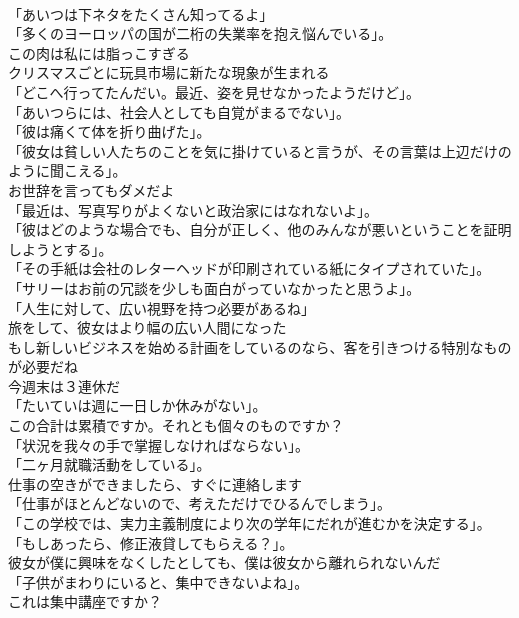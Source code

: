 \documentclass[8pt]{extreport}
\begin{document}
\begin{CJK}{UTF8}{min}
\\	「あいつは下ネタをたくさん知ってるよ」	
\\	「多くのヨーロッパの国が二桁の失業率を抱え悩んでいる」。	
\\	この肉は私には脂っこすぎる	
\\	クリスマスごとに玩具市場に新たな現象が生まれる	
\\	「どこへ行ってたんだい。最近、姿を見せなかったようだけど」。	
\\	「あいつらには、社会人としても自覚がまるでない」。	
\\	「彼は痛くて体を折り曲げた」。	
\\	「彼女は貧しい人たちのことを気に掛けていると言うが、その言葉は上辺だけのように聞こえる」。	
\\	お世辞を言ってもダメだよ	
\\	「最近は、写真写りがよくないと政治家にはなれないよ」。	
\\	「彼はどのような場合でも、自分が正しく、他のみんなが悪いということを証明しようとする」。	
\\	「その手紙は会社のレターヘッドが印刷されている紙にタイプされていた」。	
\\	「サリーはお前の冗談を少しも面白がっていなかったと思うよ」。	
\\	「人生に対して、広い視野を持つ必要があるね」	
\\	旅をして、彼女はより幅の広い人間になった	
\\	もし新しいビジネスを始める計画をしているのなら、客を引きつける特別なものが必要だね	
\\	今週末は３連休だ	
\\	「たいていは週に一日しか休みがない」。	
\\	この合計は累積ですか。それとも個々のものですか？	
\\	「状況を我々の手で掌握しなければならない」。	
\\	「二ヶ月就職活動をしている」。	
\\	仕事の空きができましたら、すぐに連絡します	
\\	「仕事がほとんどないので、考えただけでひるんでしまう」。	
\\	「この学校では、実力主義制度により次の学年にだれが進むかを決定する」。	
\\	「もしあったら、修正液貸してもらえる？」。	
\\	彼女が僕に興味をなくしたとしても、僕は彼女から離れられないんだ	
\\	「子供がまわりにいると、集中できないよね」。	
\\	これは集中講座ですか？	

\end{CJK}
\end{document}
